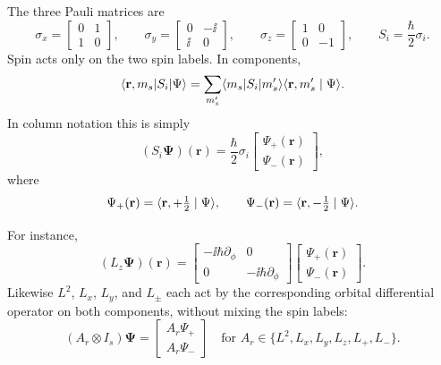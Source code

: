 The three Pauli matrices are
\[
 \sigma_x=\begin{bmatrix}0&1\\1&0\end{bmatrix},\qquad
 \sigma_y=\begin{bmatrix}0&-\ii\\\ii&0\end{bmatrix},\qquad
 \sigma_z=\begin{bmatrix}1&0\\0&-1\end{bmatrix},
 \qquad S_i=\frac\hbar2\sigma_i.
\]
Spin acts only on the two spin labels. In components,
\[
 \langle \mathbf r,m_s\rvert S_i\lvert \Psi\rangle
 =\sum_{m_s'}\langle m_s\rvert S_i\lvert m_s'\rangle
                \langle \mathbf r,m_s'\mid \Psi\rangle.
\]
In column notation this is simply
\[
 (S_i\boldsymbol\Psi)(\mathbf r)
 =\frac\hbar2\sigma_i
 \begin{bmatrix}\Psi_+(\mathbf r)\\\Psi_-(\mathbf r)\end{bmatrix},
\]
where
\[
 \Psi_+(\mathbf r)=\langle \mathbf r,+\tfrac12\mid \Psi\rangle,\qquad
 \Psi_-(\mathbf r)=\langle \mathbf r,-\tfrac12\mid \Psi\rangle.
\]

For instance,
\[
 (L_z\boldsymbol\Psi)(\mathbf r)=
 \begin{bmatrix}
  -\ii\hbar\partial_\phi&0\\
  0&-\ii\hbar\partial_\phi
 \end{bmatrix}
 \begin{bmatrix}\Psi_+(\mathbf r)\\\Psi_-(\mathbf r)\end{bmatrix}.
\]
Likewise $L^2$, $L_x$, $L_y$, and $L_\pm$ each act by the corresponding
orbital differential operator on both components, without mixing
the spin labels:
\[
 (A_r\otimes I_s)\boldsymbol\Psi
 =\begin{bmatrix}A_r\Psi_+\\A_r\Psi_-\end{bmatrix}
 \quad\text{for }A_r\in\{L^2,L_x,L_y,L_z,L_+,L_-\}.
\]
